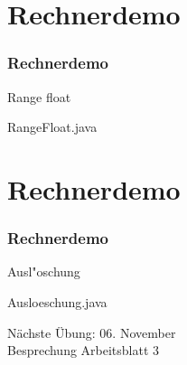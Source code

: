 \documentclass[9pt,german]{beamer}%
\begin{document}
\setcounter{exercise}{7}


\def\stitle{Rechnerdemo}
\section{\stitle}
\begin{frame}[fragile]%
  \frametitle{\stitle}%
\medskip

Range float

{RangeFloat.java}
\end{frame}



\def\stitle{Rechnerdemo}
\section{\stitle}
\begin{frame}[fragile]%
  \frametitle{\stitle}%
\medskip

Ausl"oschung

{Ausloeschung.java}
\end{frame}


\setcounter{exercise}{8}


\setcounter{exercise}{9}


\begin{frame}
\centering
\Huge{}
\vspace{2cm}

{\LARGE
N\"achste \"Ubung: 06. November\\
Besprechung Arbeitsblatt 3
}
\end{frame}


\end{document}
